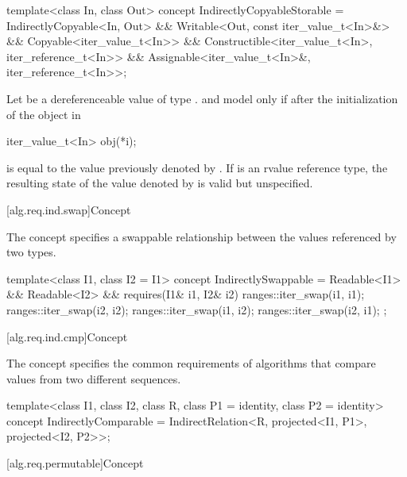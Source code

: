 %
\begin{codeblock}
template<class In, class Out>
  concept IndirectlyCopyableStorable =
    IndirectlyCopyable<In, Out> &&
    Writable<Out, const iter_value_t<In>&> &&
    Copyable<iter_value_t<In>> &&
    Constructible<iter_value_t<In>, iter_reference_t<In>> &&
    Assignable<iter_value_t<In>&, iter_reference_t<In>>;
\end{codeblock}

\pnum
Let  be a dereferenceable value of type .
 and  model 
only if after the initialization of the object  in
\begin{codeblock}
iter_value_t<In> obj(*i);
\end{codeblock}
 is equal to the value previously denoted by . If
 is an rvalue reference type, the resulting state
of the value denoted by  is
valid but unspecified.

[alg.req.ind.swap]{Concept }

\pnum
The  concept specifies a swappable relationship
between the values referenced by two  types.

%
\begin{codeblock}
template<class I1, class I2 = I1>
  concept IndirectlySwappable =
    Readable<I1> && Readable<I2> &&
    requires(I1& i1, I2& i2) {
      ranges::iter_swap(i1, i1);
      ranges::iter_swap(i2, i2);
      ranges::iter_swap(i1, i2);
      ranges::iter_swap(i2, i1);
    };
\end{codeblock}

[alg.req.ind.cmp]{Concept }

\pnum
The  concept specifies
the common requirements of algorithms that
compare values from two different sequences.

%
\begin{codeblock}
template<class I1, class I2, class R, class P1 = identity,
         class P2 = identity>
  concept IndirectlyComparable =
    IndirectRelation<R, projected<I1, P1>, projected<I2, P2>>;
\end{codeblock}

[alg.req.permutable]{Concept }

